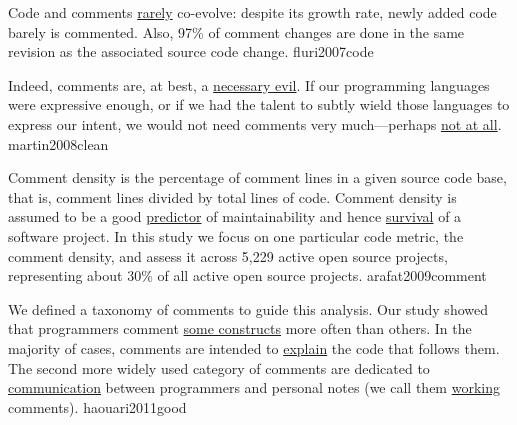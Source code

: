 \documentclass{article}
\begin{document}
  {Code and comments \ul{rarely} co-evolve: despite its growth rate, newly added code barely is commented. Also, 97\% of comment changes are done in the same revision as the associated source code change.}
  {fluri2007code}

  {Indeed, comments are, at best, a \ul{necessary evil}. If our programming languages were expressive enough, or if we had the talent to subtly wield those languages to express our intent, we would not need comments very much---perhaps \ul{not at all}.}
  {martin2008clean}

  {Comment density is the percentage of comment lines in a given source code base, that is, comment lines divided by total lines of code. Comment density is assumed to be a good \ul{predictor} of maintainability and hence \ul{survival} of a software project. In this study we focus on one particular code metric, the comment density, and assess it across 5,229 active open source projects, representing about 30\% of all active open source projects.}
  {arafat2009comment}


  {We defined a taxonomy of comments to guide this analysis. Our study showed that programmers comment \ul{some constructs} more often than others. In the majority of cases, comments are intended to \ul{explain} the code that follows them. The second more widely used category of comments are dedicated to \ul{communication} between programmers and personal notes (we call them \ul{working} comments).}
  {haouari2011good}

\end{document}
